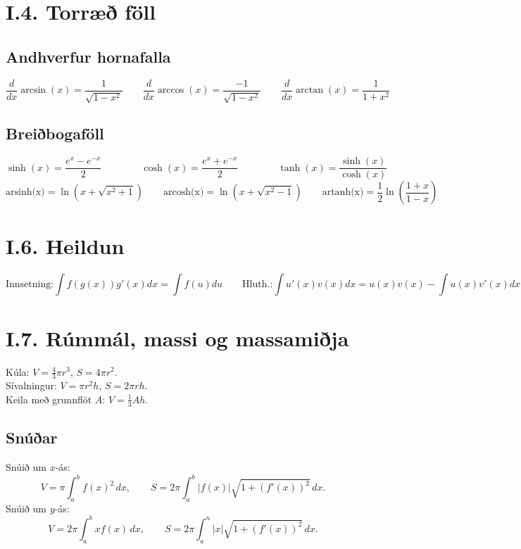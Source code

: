 \section*{I.4. Torræð föll}
\subsection*{Andhverfur hornafalla}
\[
  \frac d{dx} \arcsin(x) = \frac 1{\sqrt{1-x^2}} \qquad 
  \frac d{dx} \arccos(x) = \frac {-1}{\sqrt{1-x^2}}\qquad
  \frac d{dx} \arctan(x) = \frac 1{1+x^2}
\]


\subsection*{Breiðbogaföll}
\[
  \sinh(x) = \frac{e^x-e^{-x}}2 \qquad\qquad \cosh(x) = \frac{e^x+e^{-x}}2
  \qquad\qquad \tanh(x) = \frac {\sinh(x)}{\cosh(x)}
\]
\[
  \text{arsinh(x)} = \ln\left(x + \sqrt{x^2+1}\right) \qquad
  \text{arcosh(x)} = \ln\left(x + \sqrt{x^2-1}\right) \qquad
  \text{artanh(x)} = \frac 12\ln\left(\frac{1+x}{1-x}\right)
\]

\section*{I.6. Heildun}
\[
  \text{Innsetning:}  \int f(g(x))g'(x)dx = \int f(u)du \qquad
  \text{Hluth.:}\int u'(x)v(x)dx = u(x)v(x) -  \int u(x)v'(x)dx
\]

 
\section*{I.7. Rúmmál, massi og massamiðja}
Kúla: $V=\frac 43 \pi r^3$, $S=4\pi r^2$.\\
Sívalningur: $V=\pi r^2 h$, $S=2\pi rh$.\\
Keila með grunnflöt $A$: $V=\frac 13 Ah$.

\subsection*{Snúðar}
Snúið um $x$-ás: 
\[
  V=\pi \int_a^b f(x)^2\, dx, \qquad S= 2\pi \int_a^b |f(x)|\sqrt{1+(f'(x))^2}\, dx.
\]
Snúið um $y$-ás: 
\[
  V=2\pi \int_a^b xf(x)\, dx, \qquad S= 2\pi \int_a^n |x|\sqrt{1+(f'(x))^2}\, dx.
\]


